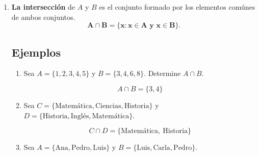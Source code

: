\documentclass[12pt]{article}
\begin{document}
\begin{enumerate}
\begin{enumerate}
\end{enumerate}

\item \textbf{La intersección} de $A$ y $B$ es el conjunto formado por los elementos comúnes de ambos conjuntos.
$$\mathbf{A\cap B = \{x: x\in A \text{ y } x\in B\}}.$$

\begin{center}
\end{center}
\subsection*{Ejemplos}

\begin{enumerate}

    \item Sea \(A = \{1, 2, 3, 4, 5\}\) 
    y \(B = \{3, 4, 6, 8\}\).  
    Determine \(A \cap B\).

    
    \[
    A \cap B = \{3, 4\}
    \]

    \item Sea \(C = \{\text{Matemática}, \text{Ciencias}, \text{Historia}\}\)
    y \(D = \{\text{Historia}, \text{Inglés}, \text{Matemática}\}\).  
    

    
    \[
    C\cap D = \{\text{Matemática},\ \text{Historia}\}
    \]

    \item Sea \(A = \{\text{Ana}, \text{Pedro}, \text{Luis}\}\)
    y \(B = \{\text{Luis}, \text{Carla}, \text{Pedro}\}\).  
    


\end{enumerate}
\end{enumerate}
\end{document}
